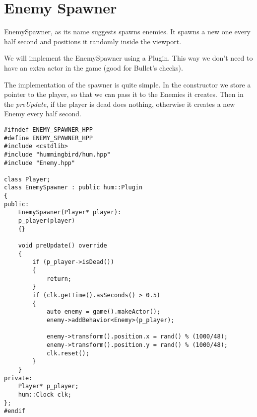 \section{Enemy Spawner}

EnemySpawner, as its name suggests spawns enemies. It spawns a new one every half second 
and positions it randomly inside the viewport.

We will implement the EnemySpawner using a Plugin. This way we don't need to have an extra 
actor in the game (good for Bullet's checks).

The implementation of the spawner is quite simple. In the constructor we store a pointer to 
the player, so that we can pass it to the Enemies it creates. Then in the \textit{preUpdate}, 
if the player is dead does nothing, otherwise it creates a new Enemy every half second.

\begin{lstlisting}
#ifndef ENEMY_SPAWNER_HPP
#define ENEMY_SPAWNER_HPP
#include <cstdlib>
#include "hummingbird/hum.hpp"
#include "Enemy.hpp"

class Player;
class EnemySpawner : public hum::Plugin
{
public:
    EnemySpawner(Player* player):
    p_player(player)
    {}

    void preUpdate() override
    {
        if (p_player->isDead())
        {
            return;
        }
        if (clk.getTime().asSeconds() > 0.5)
        {
            auto enemy = game().makeActor();
            enemy->addBehavior<Enemy>(p_player);

            enemy->transform().position.x = rand() % (1000/48);
            enemy->transform().position.y = rand() % (1000/48);
            clk.reset();
        }
    }
private:
    Player* p_player;
    hum::Clock clk;
};
#endif
\end{lstlisting}
